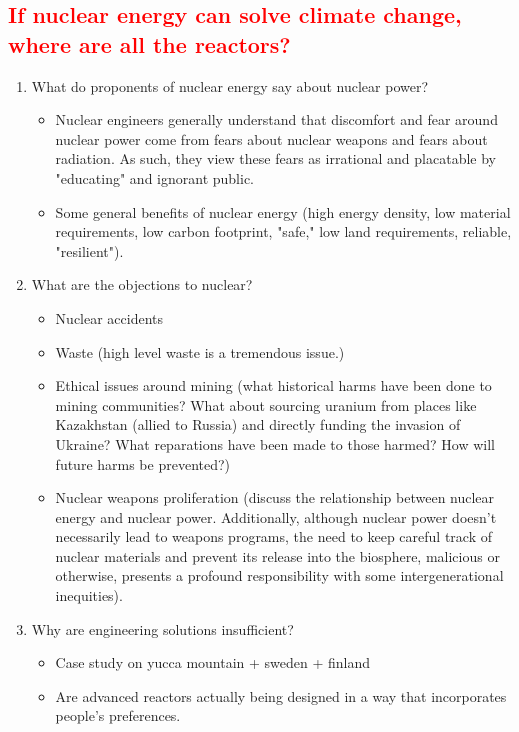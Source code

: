 \subsection{\textcolor{red}{If nuclear energy can solve climate change, where are all the reactors?}}

\begin{enumerate}
\item What do proponents of nuclear energy say about nuclear power?
\begin{itemize}
    \item Nuclear engineers generally understand that discomfort and fear 
    around nuclear power come from fears about nuclear weapons and fears 
    about radiation. As such, they view these fears as irrational and placatable
    by "educating" and ignorant public.
    \item Some general benefits of nuclear energy (high energy density, low
    material requirements, low carbon footprint, "safe," low land requirements,
    reliable, "resilient").
\end{itemize}
\item What are the objections to nuclear?
\begin{itemize}
    \item Nuclear accidents
    \item Waste (high level waste is a tremendous issue.)
    \item Ethical issues around mining (what historical harms have been done
    to mining communities? What about sourcing uranium from places like 
    Kazakhstan (allied to Russia) and directly funding the invasion of Ukraine?
    What reparations have been made to those harmed? How will future harms be prevented?)
    \item Nuclear weapons proliferation (discuss the relationship between
    nuclear energy and nuclear power. Additionally, although nuclear power 
    doesn't necessarily lead to weapons programs, the need to keep careful
    track of nuclear materials and prevent its release into the biosphere, 
    malicious or otherwise, presents a profound responsibility with some
    intergenerational inequities).
\end{itemize}
\item Why are engineering solutions insufficient?
\begin{itemize}
    \item Case study on yucca mountain + sweden + finland
    \item Are advanced reactors actually being designed in a way that incorporates people's preferences.

\end{itemize}
\end{enumerate}
